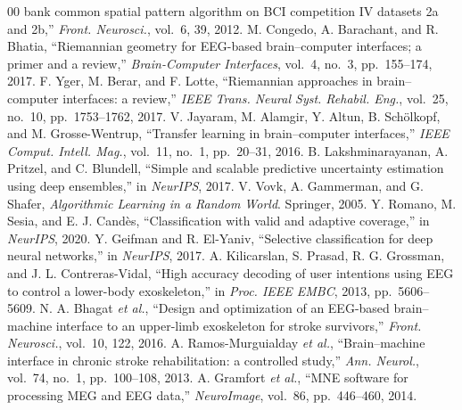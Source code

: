 \documentclass[conference]{IEEEtran}
\begin{document}
\begin{thebibliography}{00}
bank common spatial pattern algorithm on BCI competition IV datasets 2a and 2b,''
\emph{Front. Neurosci.}, vol.~6, 39, 2012.
 M. Congedo, A. Barachant, and R. Bhatia, ``Riemannian geometry
for EEG-based brain--computer interfaces; a primer and a review,''
\emph{Brain-Computer Interfaces}, vol.~4, no.~3, pp.~155--174, 2017.
 F. Yger, M. Berar, and F. Lotte, ``Riemannian approaches in
brain--computer interfaces: a review,'' \emph{IEEE Trans. Neural Syst. Rehabil.
Eng.}, vol.~25, no.~10, pp.~1753--1762, 2017.
 V. Jayaram, M. Alamgir, Y. Altun, B. Sch\"olkopf, and
M. Grosse-Wentrup, ``Transfer learning in brain--computer interfaces,'' \emph{IEEE
Comput. Intell. Mag.}, vol.~11, no.~1, pp.~20--31, 2016.
 B. Lakshminarayanan, A. Pritzel, and C. Blundell,
``Simple and scalable predictive uncertainty estimation using deep ensembles,'' in
\emph{NeurIPS}, 2017.
 V. Vovk, A. Gammerman, and G. Shafer, \emph{Algorithmic Learning
in a Random World}. Springer, 2005.
 Y. Romano, M. Sesia, and E. J. Cand\`es, ``Classification with
valid and adaptive coverage,'' in \emph{NeurIPS}, 2020.
 Y. Geifman and R. El-Yaniv, ``Selective classification for deep
neural networks,'' in \emph{NeurIPS}, 2017.
 A. Kilicarslan, S. Prasad, R. G. Grossman, and
J. L. Contreras-Vidal, ``High accuracy decoding of user intentions using EEG to
control a lower-body exoskeleton,'' in \emph{Proc. IEEE EMBC}, 2013, pp.~5606--5609.
 N. A. Bhagat \emph{et al.}, ``Design and optimization of an
EEG-based brain--machine interface to an upper-limb exoskeleton for stroke
survivors,'' \emph{Front. Neurosci.}, vol.~10, 122, 2016.
 A. Ramos-Murguialday \emph{et al.}, ``Brain--machine interface in
chronic stroke rehabilitation: a controlled study,'' \emph{Ann. Neurol.}, vol.~74,
no.~1, pp.~100--108, 2013.
 A. Gramfort \emph{et al.}, ``MNE software for processing MEG
and EEG data,'' \emph{NeuroImage}, vol.~86, pp.~446--460, 2014.
\end{thebibliography}
\end{document}
